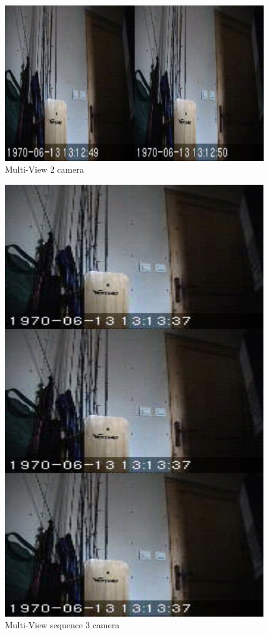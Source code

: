  \begin{figure}[H]
  \label{2cam.eps}
  \centering
   \includegraphics[scale=0.4]{Images/2cam.eps}
  \caption{Multi-View 2 camera}
\end{figure}  
\begin{figure}[H]
  \label{3cam.eps}
  \centering
   \includegraphics[scale=0.4]{Images/3cam.eps}
  \caption{Multi-View sequence 3 camera}
\end{figure}  
